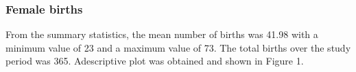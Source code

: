 \documentclass[12pt, letterpaper, twoside]{article}
\begin{document}
\subsubsection{Female births}
From the summary statistics, the mean number of births was 41.98 with a minimum value of 23 and a maximum value of 73. The total births over the study period was 365. Adescriptive plot was obtained and shown in Figure 1. 
\begin{figure}%
	    \centering
	    \qquad
	    \qquad

\end{figure}
\end{document}
